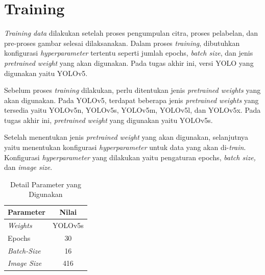 \section{Training}
\label{sec:trainingdata}

\textit{Training data} dilakukan setelah proses pengumpulan citra, proses pelabelan, dan pre-proses gambar selesai dilaksanakan. Dalam proses \textit{training}, dibutuhkan konfigurasi \textit{hyperparameter} tertentu seperti jumlah epochs, \textit{batch size}, dan jenis \textit{pretrained weight} yang akan digunakan. Pada tugas akhir ini, versi YOLO yang digunakan yaitu YOLOv5. \par

Sebelum proses \textit{training} dilakukan, perlu ditentukan jenis \textit{pretrained weights} yang akan digunakan. Pada YOLOv5, terdapat beberapa jenis \textit{pretrained weights} yang tersedia yaitu YOLOv5n, YOLOv5s, YOLOv5m, YOLOv5l, dan YOLOv5x. Pada tugas akhir ini, \textit{pretrained weight} yang digunakan yaitu YOLOv5s. \par

Setelah menentukan jenis \textit{pretrained weight} yang akan digunakan, selanjutnya yaitu menentukan konfigurasi \textit{hyperparameter} untuk data yang akan di-\textit{train}. Konfigurasi \textit{hyperparameter} yang dilakukan yaitu pengaturan epochs, \textit{batch size,} dan \textit{image size}. \par

\begin{table}[H]
    \begin{center}
        \begin{tabular}{|l|c|}
        \hline
        \multicolumn{1}{|c|}{\textbf{Parameter}} & \textbf{Nilai} \\ \hline
        \textit{Weights}                         & YOLOv5s                 \\ \hline
        Epochs                                   & 30                      \\ \hline
        \textit{Batch-Size}                      & 16                      \\ \hline
        \textit{Image Size}                      & 416                     \\ \hline
        \end{tabular}
    \end{center}
    \caption{Detail Parameter yang Digunakan}
    \label{tb:parametertrain}
    \end{table}

